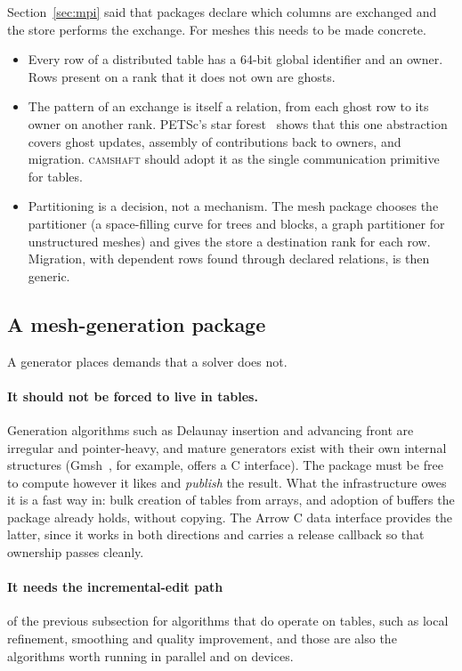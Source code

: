 \documentclass[11pt,a4paper]{article}
\newcommand{\camshaft}{\textsc{camshaft}}
\begin{document}
Section~\ref{sec:mpi} said that packages declare which columns are exchanged
and the store performs the exchange.  For meshes this needs to be made
concrete.

\begin{itemize}
  \item Every row of a distributed table has a 64-bit global identifier and
        an owner.  Rows present on a rank that it does not own are ghosts.
  \item The pattern of an exchange is itself a relation, from each ghost row
        to its owner on another rank.  PETSc's star forest~\cite{petscsf}
        shows that this one abstraction covers ghost updates, assembly of
        contributions back to owners, and migration.  \camshaft{} should adopt
        it as the single communication primitive for tables.
  \item Partitioning is a decision, not a mechanism.  The mesh package
        chooses the partitioner (a space-filling curve for trees and blocks, a
        graph partitioner for unstructured meshes) and gives the store a
        destination rank for each row.  Migration, with dependent rows found
        through declared relations, is then generic.
\end{itemize}

\subsection{A mesh-generation package}

A generator places demands that a solver does not.

\paragraph{It should not be forced to live in tables.}  Generation
algorithms such as Delaunay insertion and advancing front are irregular and
pointer-heavy, and mature generators exist with their own internal
structures (Gmsh~\cite{gmsh}, for example, offers a C interface).  The
package must be free to compute however it likes and \emph{publish} the
result.  What the infrastructure owes it is a fast way in: bulk creation of
tables from arrays, and adoption of buffers the package already holds,
without copying.  The Arrow C data interface provides the latter, since it
works in both directions and carries a release callback so that ownership
passes cleanly.

\paragraph{It needs the incremental-edit path} of the previous subsection for
algorithms that do operate on tables, such as local refinement, smoothing
and quality improvement, and those are also the algorithms worth running in
parallel and on devices.
\end{document}
